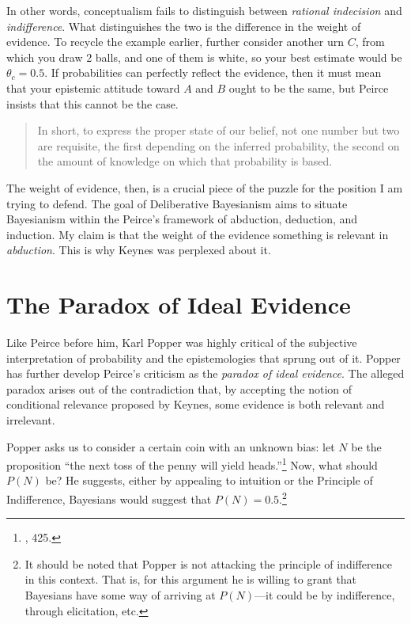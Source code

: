 In other words, conceptualism fails to distinguish between
\emph{rational indecision} and \emph{indifference}. What distinguishes
the two is the difference in the weight of evidence. To recycle the
example earlier, further consider another urn \(C\), from which you draw
2 balls, and one of them is white, so your best estimate would be
\(\theta_c = 0.5\). If probabilities can perfectly reflect the evidence,
then it must mean that your epistemic attitude toward \(A\) and \(B\)
ought to be the same, but Peirce insists that this cannot be the case.

\begin{quote}
In short, to express the proper state of our belief, not one number but
two are requisite, the first depending on the inferred probability, the
second on the amount of knowledge on which that probability is based.
\end{quote}

The weight of evidence, then, is a crucial piece of the puzzle for the
position I am trying to defend. The goal of Deliberative Bayesianism
aims to situate Bayesianism within the Peirce's framework of abduction,
deduction, and induction. My claim is that the weight of the evidence something is relevant in \emph{abduction}. This is why Keynes was perplexed about it. 

\hypertarget{the-paradox-of-ideal-evidence-1}{%
\section{The Paradox of Ideal
Evidence}\label{the-paradox-of-ideal-evidence-1}}

Like Peirce before him, Karl Popper was highly critical of the
subjective interpretation of probability and the epistemologies that
sprung out of it. Popper has further develop Peirce's criticism as the
\emph{paradox of ideal evidence}. The alleged paradox arises out of the
contradiction that, by accepting the notion of conditional relevance
proposed by Keynes, some evidence is both relevant and irrelevant.

Popper asks us to consider a certain coin with an unknown bias: let
\(N\) be the proposition ``the next toss of the penny will yield
heads.''\footnote{\cite{popperlogic}, 425.}
Now, what should \(P(N)\) be? He suggests, either by appealing to
intuition or the Principle of Indifference, Bayesians would suggest that
\(P(N) = 0.5\).\footnote{It should be noted that Popper is not attacking
  the principle of indifference in this context. That is, for this
  argument he is willing to grant that Bayesians have some way of
  arriving at \(P(N)\)---it could be by indifference, through
  elicitation, etc.}

